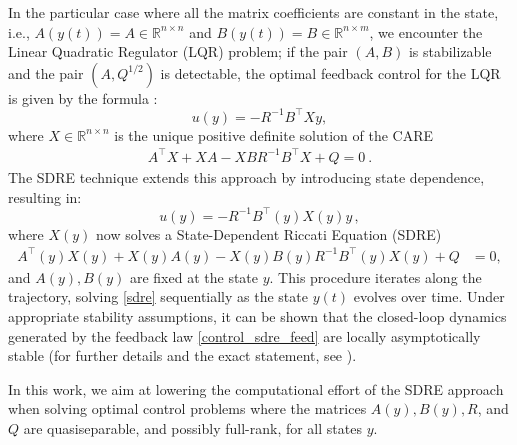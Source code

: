 \documentclass[a4paper,10pt]{article}
\begin{document}
In the particular case where all the matrix coefficients are constant in the state, i.e.,  $A(y(t)) = A \in \mathbb{R}^{n\times n}$ and  $B(y(t)) = B \in \mathbb{R}^{n\times m}$,  we encounter the Linear Quadratic Regulator (LQR) problem; if the pair $(A,B)$ is stabilizable and the pair $(A,Q^{1/2})$ is detectable, the optimal feedback control for the LQR is given by the formula \cite{anderson2007optimal}:
\begin{equation*}
	u(y) = -R^{-1} B^{\top} Xy,
	\label{control_SDRE}
\end{equation*}
where $X\in\mathbb{R}^{n\times n}$ is the unique positive definite solution of the CARE
\begin{align*}
	A^\top X + X A
	-X BR^{-1}B^\top X +Q = 0\ .
\end{align*}
The SDRE technique extends this approach by introducing state dependence, resulting in:
\begin{equation}
	u(y) = -R^{-1} B^{\top}(y) X(y)y\,,
	\label{control_sdre_feed}
\end{equation}
where $X(y)$ now solves a State-Dependent Riccati Equation (SDRE)
\begin{align}
	A^\top(y) X(y) + X(y) A(y)-X(y)B(y)R^{-1}B^\top(y)X(y)+Q & = 0,
	\label{sdre}
\end{align}
and $A(y),B(y)$ are fixed at the state $y$.
This procedure iterates along the trajectory, solving \eqref{sdre} sequentially as the state $y(t)$ evolves over time.
Under appropriate stability assumptions, it can be shown that the closed-loop dynamics generated by the feedback law \eqref{control_sdre_feed} are locally asymptotically stable (for further details and the exact statement, see \cite{Banks_Lewis_Tran_2007}).

In this work, we aim at lowering the computational effort of the SDRE approach when solving  optimal control problems where the matrices $A(y),B(y),R$, and $Q$ are quasiseparable, and possibly full-rank, for all states $y$.  



\end{document}
